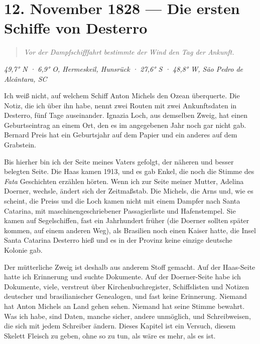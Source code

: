 \documentclass[
  ngerman,
  11pt,
  openany]{book}
\begin{document}
\chapter{12. November 1828 --- Die ersten Schiffe von
Desterro}\label{cap-8}

\begin{quote}
\emph{Vor der Dampfschifffahrt bestimmte der Wind den Tag der Ankunft.}
\end{quote}

\emph{49,7° N · 6,9° O, Hermeskeil, Hunsrück · 27,6° S · 48,8° W, São
Pedro de Alcântara, SC}

Ich weiß nicht, auf welchem Schiff Anton Michels den Ozean überquerte.
Die Notiz, die ich über ihn habe, nennt zwei Routen mit zwei
Ankunftsdaten in Desterro, fünf Tage auseinander. Ignazia Loch, aus
demselben Zweig, hat einen Geburtseintrag an einem Ort, den es im
angegebenen Jahr noch gar nicht gab. Bernard Preis hat ein Geburtsjahr
auf dem Papier und ein anderes auf dem Grabstein.

Bis hierher bin ich der Seite meines Vaters gefolgt, der näheren und
besser belegten Seite. Die Haas kamen 1913, und es gab Enkel, die noch
die Stimme des \emph{Fata} Geschichten erzählen hörten. Wenn ich zur
Seite meiner Mutter, Adelina Doerner, wechsle, ändert sich der
Zeitmaßstab. Die Michels, die Arns und, wie es scheint, die Preiss und
die Loch kamen nicht mit einem Dampfer nach Santa Catarina, mit
maschinengeschriebener Passagierliste und Hafenstempel. Sie kamen auf
Segelschiffen, fast ein Jahrhundert früher (die Doerner sollten später
kommen, auf einem anderen Weg), als Brasilien noch einen Kaiser hatte,
die Insel Santa Catarina Desterro hieß und es in der Provinz keine
einzige deutsche Kolonie gab.

Der mütterliche Zweig ist deshalb aus anderem Stoff gemacht. Auf der
Haas-Seite hatte ich Erinnerung und suchte Dokumente. Auf der
Doerner-Seite habe ich Dokumente, viele, verstreut über
Kirchenbuchregister, Schiffslisten und Notizen deutscher und
brasilianischer Genealogen, und fast keine Erinnerung. Niemand hat Anton
Michels an Land gehen sehen. Niemand hat seine Stimme bewahrt. Was ich
habe, sind Daten, manche sicher, andere unmöglich, und Schreibweisen,
die sich mit jedem Schreiber ändern. Dieses Kapitel ist ein Versuch,
diesem Skelett Fleisch zu geben, ohne so zu tun, als wäre es mehr, als
es ist.
\end{document}
